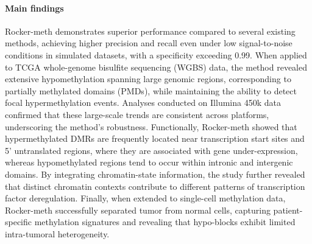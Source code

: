 \documentclass[10pt]{extarticle}
\begin{document}
\paragraph{Main findings}
Rocker-meth demonstrates superior performance compared to several existing methods, achieving higher precision and recall even under low signal-to-noise conditions in simulated datasets, with a specificity exceeding 0.99. When applied to TCGA whole-genome bisulfite sequencing (WGBS) data, the method revealed extensive hypomethylation spanning large genomic regions, corresponding to partially methylated domains (PMDs), while maintaining the ability to detect focal hypermethylation events. Analyses conducted on Illumina 450k data confirmed that these large-scale trends are consistent across platforms, underscoring the method’s robustness. Functionally, Rocker-meth showed that hypermethylated DMRs are frequently located near transcription start sites and 5’ untranslated regions, where they are associated with gene under-expression, whereas hypomethylated regions tend to occur within intronic and intergenic domains. By integrating chromatin-state information, the study further revealed that distinct chromatin contexts contribute to different patterns of transcription factor deregulation. Finally, when extended to single-cell methylation data, Rocker-meth successfully separated tumor from normal cells, capturing patient-specific methylation signatures and revealing that hypo-blocks exhibit limited intra-tumoral heterogeneity.
\end{document}
